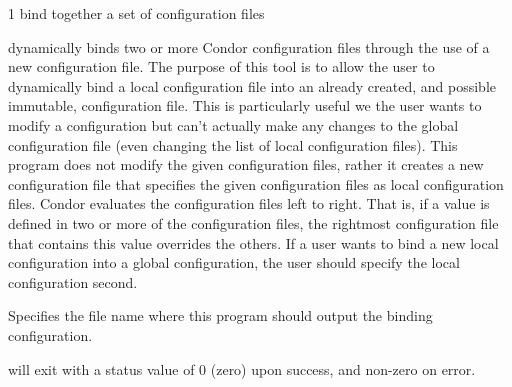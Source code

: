 \begin{ManPage}{\label{man-condor-config-bind}}{1}
{bind together a set of configuration files}

\Synopsis {}


\Description

 dynamically binds two or more Condor
configuration files through the use of a new configuration file.  The
purpose of this tool is to allow the user to dynamically bind a local
configuration file into an already created, and possible immutable,
configuration file.  This is particularly useful we the user wants to
modify a configuration but can't actually make any changes to the
global configuration file (even changing the list of local configuration
files).  This program does not modify the given configuration files,
rather it creates a new configuration file that specifies the given
configuration files as local configuration files.  Condor evaluates
the configuration files left to right.  That is, if a value is defined
in two or more of the configuration files, the rightmost configuration
file that contains this value overrides the others.  If a user wants to
bind a new local configuration into a global configuration, the user
should specify the local configuration second.

\begin{Options}
   {
    Specifies the file name where this program should output the
    binding configuration. 
  }
\end{Options}

\ExitStatus

 will exit with a status value of 0 (zero) upon
success, and non-zero on error.

\end{ManPage}
